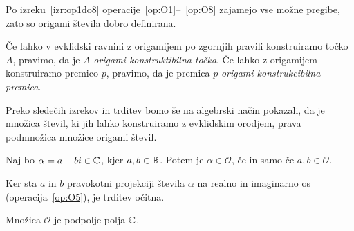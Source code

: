 \begin{opomba}
    Po izreku~\ref{izr:op1do8} operacije~\ref{op:O1}--~\ref{op:O8} zajamejo vse možne pregibe, zato so origami števila dobro definirana.
\end{opomba}

\begin{definicija}
    Če lahko v evklidski ravnini z origamijem po zgornjih pravili konstruiramo točko $A$, pravimo, da je $A$ \emph{origami-konstruktibilna točka}. Če lahko z origamijem konstruiramo premico $p$, pravimo, da je premica $p$ \emph{origami-konstrukcibilna premica}.
\end{definicija}

Preko sledečih izrekov in trditev bomo še na algebrski način pokazali, da je množica števil, ki jih lahko konstruiramo z evklidskim orodjem, prava podmnožica množice origami števil.

\begin{trditev}
    \label{trd:zaprt_koord}
    Naj bo $\alpha = a + bi \in \mathbb C$, kjer $a, b \in \mathbb R$. Potem je $\alpha \in \mathcal{O}$, če in samo če $a, b \in \mathcal{O}$.
\end{trditev}
\begin{dokaz}
    Ker sta $a$ in $b$ pravokotni projekciji števila $\alpha$ na realno in imaginarno os (operacija~\ref{op:O5}), je trditev očitna.
\end{dokaz}

\begin{izrek}
    \label{izr:podpolje}
    Množica $\mathcal{O}$ je podpolje polja $\mathbb C$.
\end{izrek}

